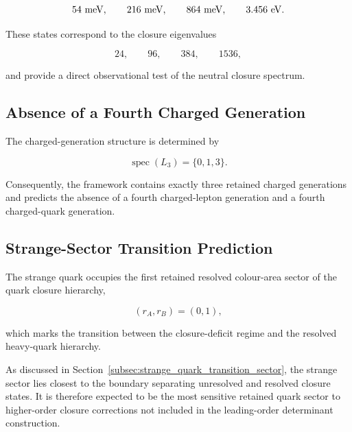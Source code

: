 \documentclass[11pt]{article}
\theoremstyle{definition}
\theoremstyle{remark}
\begin{document}
\begin{align}
54~{\rm meV},
\qquad
216~{\rm meV},
\qquad
864~{\rm meV},
\qquad
3.456~{\rm eV}.
\end{align}

These states correspond to the closure eigenvalues

\begin{equation}
24,
\qquad
96,
\qquad
384,
\qquad
1536,
\end{equation}

and provide a direct observational test of the neutral closure
spectrum.


\subsection{Absence of a Fourth Charged Generation}
\label{subsec:prediction_no_fourth_generation}

The charged-generation structure is determined by

\begin{equation}
\operatorname{spec}(L_3)
=
\{0,1,3\}.
\end{equation}

Consequently, the framework contains exactly three retained
charged generations and predicts the absence of a fourth
charged-lepton generation and a fourth charged-quark generation.



\subsection{Strange-Sector Transition Prediction}
\label{subsec:prediction_strange_transition}

The strange quark occupies the first retained resolved
colour-area sector of the quark closure hierarchy,

\begin{equation}
(r_A,r_B)=(0,1),
\end{equation}

which marks the transition between the closure-deficit regime
and the resolved heavy-quark hierarchy.

As discussed in
Section~\ref{subsec:strange_quark_transition_sector},
the strange sector lies closest to the boundary separating
unresolved and resolved closure states. It is therefore
expected to be the most sensitive retained quark sector to
higher-order closure corrections not included in the
leading-order determinant construction.
\end{document}
